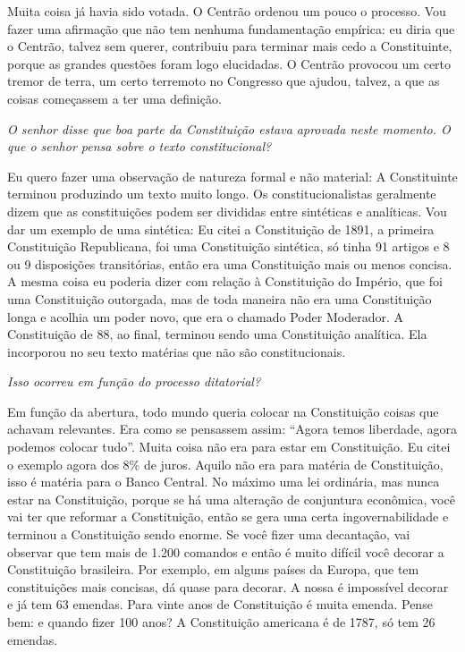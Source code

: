 Muita coisa já havia sido votada. O Centrão ordenou um pouco o processo.
Vou fazer uma afirmação que não tem nenhuma fundamentação empírica: eu
diria que o Centrão, talvez sem querer, contribuiu para terminar mais
cedo a Constituinte, porque as grandes questões foram logo elucidadas. O
Centrão provocou um certo tremor de terra, um certo terremoto no
Congresso que ajudou, talvez, a que as coisas começassem a ter uma
definição.

\medskip

\emph{O senhor disse que boa parte da Constituição estava aprovada
neste momento. O que o senhor pensa sobre o texto constitucional?}

Eu quero fazer uma observação de natureza formal e não
material: A Constituinte terminou produzindo um texto muito longo. Os
constitucionalistas geralmente dizem que as constituições podem ser
divididas entre sintéticas e analíticas. Vou dar um exemplo de uma
sintética: Eu citei a Constituição de 1891, a primeira Constituição
Republicana, foi uma Constituição sintética, só tinha 91 artigos e 8 ou
9 disposições transitórias, então era uma Constituição mais ou menos
concisa. A mesma coisa eu poderia dizer com relação à Constituição do
Império, que foi uma Constituição outorgada, mas de toda maneira não era
uma Constituição longa e acolhia um poder novo, que era o chamado Poder
Moderador. A Constituição de 88, ao final, terminou sendo uma
Constituição analítica. Ela incorporou no seu texto matérias que não são
constitucionais.

\medskip

\emph{Isso ocorreu em função do processo ditatorial?}

Em função da abertura, todo mundo queria colocar na
Constituição coisas que achavam relevantes. Era como se pensassem assim:
``Agora temos liberdade, agora podemos colocar tudo''. Muita coisa não
era para estar em Constituição. Eu citei o exemplo agora dos 8\% de
juros. Aquilo não era para matéria de Constituição, isso é matéria para
o Banco Central. No máximo uma lei ordinária, mas nunca estar na
Constituição, porque se há uma alteração de conjuntura econômica, você
vai ter que reformar a Constituição, então se gera uma certa
ingovernabilidade e terminou a Constituição sendo enorme. Se você fizer
uma decantação, vai observar que tem mais de 1.200 comandos e então é
muito difícil você decorar a Constituição brasileira. Por exemplo, em
alguns países da Europa, que tem constituições mais concisas, dá quase
para decorar. A nossa é impossível decorar e já tem 63 emendas. Para
vinte anos de Constituição é muita emenda. Pense bem: e quando fizer 100
anos? A Constituição americana é de 1787, só tem 26 emendas.

